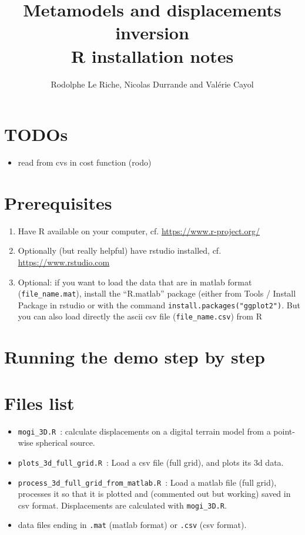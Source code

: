 \documentclass[12pt]{article}
\begin{document}
\title{Metamodels and displacements  inversion \\ R installation notes}
\author{Rodolphe Le Riche, Nicolas Durrande and Valérie Cayol}
\maketitle

\section{TODOs}
\begin{itemize}
\item read from cvs in cost function (rodo)
\end{itemize}

\section{Prerequisites}
\begin{enumerate}
\item Have R available on your computer, cf. \url{https://www.r-project.org/}
\item Optionally (but really helpful) have rstudio installed, cf. \url{https://www.rstudio.com}
\item Optional: if you want to load the data that are in matlab format (\texttt{file\_name.mat}), 
install the ``R.matlab'' package (either from Tools / Install Package in rstudio or with the command \texttt{install.packages("ggplot2")}. But you can also load directly the ascii csv file (\texttt{file\_name.csv}) from R
\end{enumerate}

\section{Running the demo step by step}

\section{Files list}
\begin{itemize}
\item \texttt{mogi\_3D.R}~: calculate displacements on a digital terrain model from a point-wise spherical source.
\item \texttt{plots\_3d\_full\_grid.R}~: Load a csv file (full grid), and plots its 3d data.
\item \texttt{process\_3d\_full\_grid\_from\_matlab.R}~: Load a matlab file (full grid), processes it so that it is plotted and (commented out but working) saved in csv format. Displacements are calculated with \texttt{mogi\_3D.R}.
\item data files ending in \texttt{.mat} (matlab format) or \texttt{.csv} (csv format).
\end{itemize}
\end{document}

